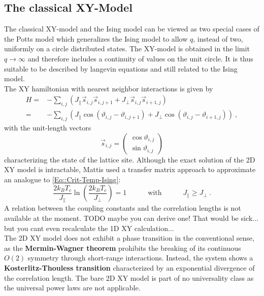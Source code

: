 		\subsection{The classical XY-Model}
		The classical XY-model and the Ising model can be viewed as two special cases of the Potts model \cite{potts1952some} which generalizes the Ising model to allow $q$, instead of two, uniformly on a circle distributed states. The XY-model is obtained in the limit $q \rightarrow \infty$ and therefore includes a continuity of values on the unit circle. It is thus suitable to be described by langevin equations and still related to the Ising model. \\
		
		The XY hamiltonian with nearest neighbor interactions is given by
		\begin{equation}
			\begin{split}
							H =&- \sum_{i,j}^{} \left(J_\parallel \vec{s}_{i,j} \vec{s}_{i,j + 1} + J_\perp  \vec{s}_{i,j} \vec{s}_{i + 1,j} \right)   \\
							=&- \sum_{i,j}^{} \left(J_\parallel  \cos \left(\vartheta_{i,j} - \vartheta_{i, j+1} \right) + J_\perp  \cos \left(\vartheta_{i,j} - \vartheta_{i+1, j} \right) \right)	 ~,
			\end{split}
		\end{equation}
		with the unit-length vectors
		\begin{equation}
			\vec{s}_{i, j} =	\left(\begin{array}{c}
				\cos \vartheta_{i, j} \\
				\sin \vartheta_{i, j}
			\end{array}\right)
		\end{equation}
		characterizing the state of the lattice site. Although the exact solution of the 2D XY model is intractable, Mattis \cite{mattis1984transfer} used a transfer matrix approach to approximate an analogue to \autoref{Eq::Crit-Temp-Ising}:
		\begin{equation} \label{Eq::Crit-Temp-XY}
			\frac{2 k_B T_c}{J_\parallel} \ln \left(\frac{2 k_B T_c}{J_\perp}\right) =	1 \quad \qquad \text{with} \qquad \quad J_\parallel \geq J_\perp~.
		\end{equation}
		A relation between the coupling constants and the correlation lengths is not available at the moment. TODO maybe you can derive one! That would be sick... but you cant even recalculate the 1D XY calculation... \\
		
		The 2D XY model does not exhibit a phase transition in the conventional sense, as the \textbf{Mermin-Wagner theorem} \cite{mermin1966absence} prohibits the breaking of its continuous $O(2)$ symmetry through short-range interactions. Instead, the system shows a \textbf{Kosterlitz-Thouless transition} \cite{JMKosterlitz_1973, berezinskii1971destruction} characterized by an exponential divergence of the correlation length. The bare 2D XY model is part of no universality class as the universal power laws are not applicable. \\
		
